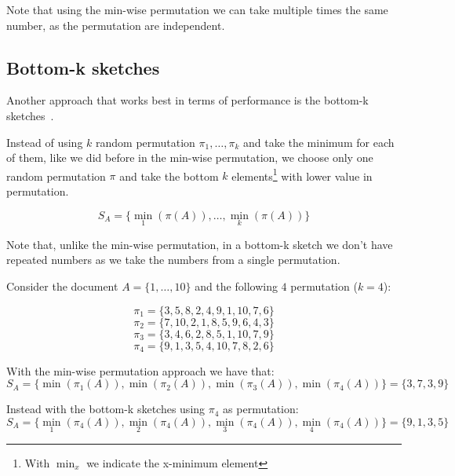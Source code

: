 \medskip

Note that using the min-wise permutation we can take multiple times the same number, as the permutation are independent.

\subsection*{Bottom-k sketches}

Another approach that works best in terms of performance is the bottom-k sketches~\cite{Cohen:2007:SDU:1281100.1281133}.\medskip

Instead of using $k$ random permutation $\pi_{1}, \ldots, \pi_{k}$ and take the minimum for each of them,
like we did before in the min-wise permutation, we choose only one random permutation $\pi$ and take the bottom $k$ elements\footnote{With $\min_{x}$ we indicate the x-minimum element} with lower value in permutation.

\begin{equation}
S_{A} = \{ \min_{1}(\pi(A)), \ldots, \min_{k}(\pi(A)) \}
\end{equation}

\medskip

Note that, unlike the min-wise permutation, in a bottom-k sketch we don't have repeated numbers as we take the numbers from a single permutation.

\begin{esempio}
	Consider the document $A=\{1, \ldots, 10\}$ and the following $4$ permutation ($k = 4$):
	
	\begin{equation*}
	\pi_{1} = \{3, 5, 8, 2, 4, 9, 1, 10, 7, 6\}
	\end{equation*}
	\begin{equation*}
	\pi_{2} = \{7, 10, 2, 1, 8, 5, 9, 6, 4, 3\}
	\end{equation*}
	\begin{equation*}
	\pi_{3} = \{3, 4, 6, 2, 8, 5, 1, 10, 7, 9\}
	\end{equation*}
	\begin{equation*}
	\pi_{4} = \{9, 1, 3, 5, 4, 10, 7, 8, 2, 6\}
	\end{equation*}
	
	With the min-wise permutation approach we have that:
	\begin{equation*}
	S_{A} = \{ \min(\pi_{1}(A)), \min(\pi_{2}(A)), \min(\pi_{3}(A)), \min(\pi_{4}(A)) \} = \{3, 7, 3, 9\}
	\end{equation*}
	
	Instead with the bottom-k sketches using $\pi_{4}$ as permutation:
	\begin{equation*}
	S_{A} = \{ \min_{1}(\pi_{4}(A)), \min_{2}(\pi_{4}(A)), \min_{3}(\pi_{4}(A)), \min_{4}(\pi_{4}(A)) \} = \{9, 1, 3, 5\}
	\end{equation*}
	
\end{esempio}


